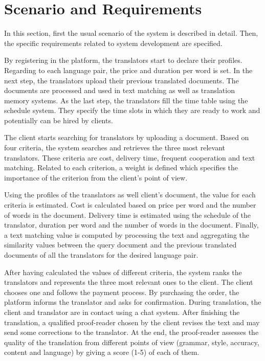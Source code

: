 \section{Scenario and Requirements}
\label{sec:scenario}
In this section, first the usual scenario of the system is described in detail. Then, the specific requirements related to system development are specified.

By registering in the platform, the translators start to declare their profiles. Regarding to each language pair, the price and duration per word is set. In the next step, the translators upload their previous translated documents. The documents are processed and used in text matching as well as  translation memory systems. As the last step, the translators fill the time table using the schedule system. They specify the time slots in which they are ready to work and potentially can be hired by clients.

The client starts searching for translators by uploading a document. Based on four criteria, the system searches and retrieves the three most relevant translators. These criteria are cost, delivery time, frequent cooperation and text matching. Related to each criterion, a weight is defined which specifies the importance of the criterion from the client's point of view.

Using the profiles of the translators as well client's document, the value for each criteria is estimated. Cost is calculated based on price per word and the number of words in the document. Delivery time is estimated using the schedule of the translator, duration per word and the number of words in the document. Finally, a text matching value is computed by processing the text and aggregating the similarity values between the query document and the previous translated documents of all the translators for the desired language pair.

After having calculated the values of different criteria, the system ranks the translators and represents the three most relevant ones to the client. The client chooses one and follows the payment process. By purchasing the order, the platform informs the translator and asks for confirmation. During translation, the client and translator are in contact using a chat system. After finishing the translation, a qualified proof-reader chosen by the client revises the text and may send some corrections to the translator. At the end, the proof-reader assesses the quality of the translation from different points of view (grammar, style, accuracy, content and language) by giving a score (1-5) of each of them.

